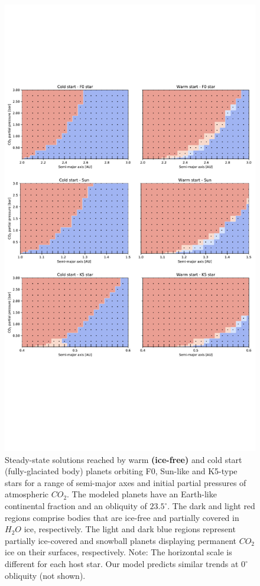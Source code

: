\documentclass[fleqn,usenatbib]{mnras}
\providecommand{\DIFadd}[1]{{\bf #1}} %
\providecommand{\DIFaddFL}[1]{\DIFadd{#1}} %
\providecommand{\DIFaddbeginFL}{} %
\providecommand{\DIFaddendFL}{} %
\newcommand{\DIFaddincludegraphics}[2][]{{\color{blue}\fbox{\DIFOincludegraphics[#1]{#2}}}} %
\DeclareRobustCommand{\DIFaddbeginFL}{\DIFOaddbeginFL \let\includegraphics\DIFaddincludegraphics} %
\DeclareRobustCommand{\DIFaddendFL}{\DIFOaddendFL \let\includegraphics\DIFOincludegraphics} %
\begin{document}
\begin{figure}
	\includegraphics[width=\textwidth]{Figures/Steady_state_all.pdf}
    \caption{Steady-state solutions reached by warm \DIFaddbeginFL \DIFaddFL{(ice-free) }\DIFaddendFL and cold start (fully-glaciated body) planets orbiting F0, Sun-like and K5-type stars for a range of semi-major axes and initial partial pressures of atmospheric $CO_{\mathrm{2}}$. The modeled planets have an Earth-like continental fraction and an obliquity of $23.5^{\circ}$. The dark and light red regions comprise bodies that are ice-free and partially covered in $H_{\mathrm{2}}O$ ice, respectively. The light and dark blue regions represent partially ice-covered and snowball planets displaying permanent $CO_{\mathrm{2}}$ ice on their surfaces, respectively. Note: The horizontal scale is different for each host star. Our model predicts similar trends at $0^{\circ}$ obliquity (not shown).} 
    \label{fig:ss_all}
\end{figure}
\end{document}
